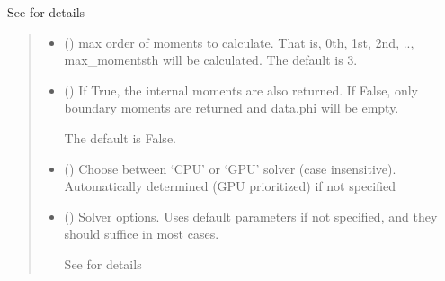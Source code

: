 \documentclass[letterpaper,10pt,english]{sphinxmanual}
\begin{document}
\begin{fulllineitems}
\begin{fulllineitems}
\sphinxAtStartPar
See {\hyperref[\detokenize{_autosummary/nirfasterff.forward.femdata.femdata_stnd_TR_moments:nirfasterff.forward.femdata.femdata_stnd_TR_moments}]{}} for details
\begin{quote}\begin{description}
\begin{itemize}
\item {} 
\sphinxAtStartPar
{} (\sphinxstyleliteralemphasis{\sphinxupquote{, }}) \textendash{} max order of moments to calculate. That is, 0th, 1st, 2nd, .., max\_moments\sphinxhyphen{}th will be calculated. The default is 3.

\item {} 
\sphinxAtStartPar
{} (\sphinxstyleliteralemphasis{\sphinxupquote{, }}) \textendash{} 
\sphinxAtStartPar
If True, the internal moments are also returned. If False, only boundary moments are returned and data.phi will be empty.

\sphinxAtStartPar
The default is False.


\item {} 
\sphinxAtStartPar
{} (\sphinxstyleliteralemphasis{\sphinxupquote{, }}) \textendash{} Choose between ‘CPU’ or ‘GPU’ solver (case insensitive). Automatically determined (GPU prioritized) if not specified

\item {} 
\sphinxAtStartPar
{} ({\hyperref[\detokenize{_autosummary/nirfasterff.utils.SolverOptions:nirfasterff.utils.SolverOptions}]{}}\sphinxstyleliteralemphasis{\sphinxupquote{, }}) \textendash{} 
\sphinxAtStartPar
Solver options. Uses default parameters if not specified, and they should suffice in most cases.

\sphinxAtStartPar
See {\hyperref[\detokenize{_autosummary/nirfasterff.utils.SolverOptions:nirfasterff.utils.SolverOptions}]{}} for details



\end{itemize}
\end{description}
\end{quote}
\end{fulllineitems}
\end{fulllineitems}
\end{document}
